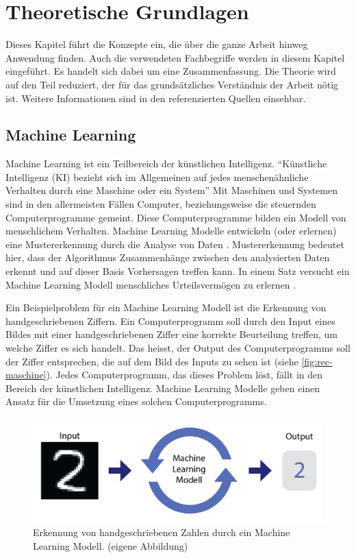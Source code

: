 \chapter{Theoretische Grundlagen}\label{chap:t}
Dieses Kapitel führt die Konzepte ein, die über die ganze Arbeit hinweg
Anwendung finden. Auch die verwendeten Fachbegriffe werden in diesem Kapitel
eingeführt. Es handelt sich dabei um eine Zusammenfassung. Die Theorie wird auf den
Teil reduziert, der für das grundsätzliches Verständnis der Arbeit nötig ist.
Weitere Informationen sind in den referenzierten Quellen einsehbar.
 
\section{Machine Learning}\label{chap:t_ml}
Machine Learning ist ein Teilbereich der künstlichen Intelligenz. ``Künstliche
Intelligenz (KI) bezieht sich im Allgemeinen auf jedes menschenähnliche
Verhalten durch eine Maschine oder ein System'' \cite{noauthor_what_nodate} Mit
Maschinen und Systemen sind in den allermeisten Fällen Computer, beziehungsweise
die steuernden Computerprogramme gemeint. Diese Computerprogramme bilden ein
Modell von menschlichem Verhalten. Machine Learning Modelle entwickeln (oder
erlernen) eine Mustererkennung durch die Analyse von Daten
\cite{noauthor_what_nodate-1}. Mustererkennung bedeutet hier, dass der
Algorithmus Zusammenhänge zwischen den analysierten Daten erkennt und auf dieser
Basis Vorhersagen treffen kann. In einem Satz versucht ein Machine
Learning Modell menschliches Urteilsvermögen zu erlernen
\cite{spaulding_is_2020}.
 
Ein Beispielproblem für ein Machine Learning Modell ist die Erkennung von
handgeschriebenen Ziffern. Ein Computerprogramm soll durch den Input eines
Bildes mit einer handgeschriebenen Ziffer eine korrekte Beurteilung treffen, um
welche Ziffer es sich handelt. Das heisst, der Output des Computerprogramms soll
der Ziffer entsprechen, die auf dem Bild des Inputs zu sehen ist (siehe
\autoref{fig:rec-maschine}). Jedes Computerprogramm, das dieses Problem löst,
fällt in den Bereich der künstlichen Intelligenz. Machine Learning Modelle geben
einen Ansatz für die Umsetzung eines solchen Computerprogramms.
 
\begin{figure}[!ht]
   \centering
   \includegraphics[width=\textwidth]{images/theorie/rec-maschine.png}
   \caption{Erkennung von handgeschriebenen Zahlen durch ein Machine Learning Modell. (eigene Abbildung)}\label{fig:rec-maschine}
\end{figure}
 
